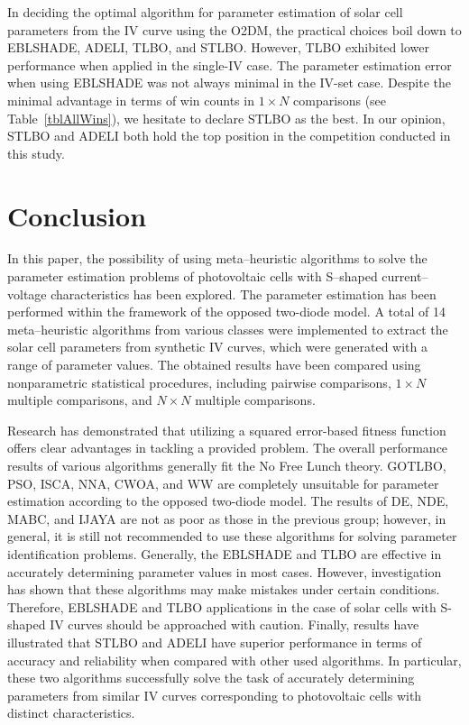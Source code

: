 \documentclass[a4paper,fleqn]{cas-dc}
\begin{document}
In deciding the optimal algorithm for parameter estimation of solar cell parameters
from the IV curve using the O2DM,
the practical choices boil down to EBLSHADE, ADELI, TLBO, and STLBO.
However, TLBO exhibited lower performance when applied in the single-IV case.
The parameter estimation error when using EBLSHADE was not always minimal in the IV-set case.
Despite the minimal advantage in terms of win counts in $1\times N$ comparisons
(see Table~\ref{tblAllWins}),
we hesitate to declare STLBO as the best.
In our opinion, STLBO and ADELI both hold the top position in the competition conducted in this study.





\section{Conclusion}

In this paper, the possibility of using meta--heuristic algorithms
to solve the parameter estimation problems of photovoltaic cells
with S--shaped current--voltage characteristics has been explored.
The parameter estimation has been performed within the framework of the opposed two-diode model.
A total of 14 meta--heuristic algorithms from various classes were implemented
to extract the solar cell parameters from synthetic IV curves, which were generated with a range of parameter values.
The obtained results have been compared using nonparametric statistical procedures,
including pairwise comparisons, $1\times N$ multiple comparisons, and $N\times N$ multiple comparisons.

Research has demonstrated that utilizing a squared error-based fitness function offers clear advantages in tackling a provided problem.
The overall performance results of various algorithms generally fit the No Free Lunch theory.
GOTLBO, PSO, ISCA, NNA, CWOA, and WW are completely unsuitable for parameter estimation according to the opposed two-diode model.
The results of DE, NDE, MABC, and IJAYA are not as poor as those in the previous group;
however, in general, it is still not recommended to use these algorithms for solving parameter identification problems.
Generally, the EBLSHADE and TLBO are effective in accurately determining parameter values in most cases.
However, investigation has shown that these algorithms may make mistakes under certain conditions.
Therefore, EBLSHADE and TLBO applications in the case of solar cells with S-shaped IV curves should be approached with caution.
Finally, results have illustrated that STLBO and ADELI have superior performance in terms of accuracy and reliability
when compared with other used algorithms.
In particular, these two algorithms successfully solve the task of accurately determining parameters
from similar IV curves corresponding to photovoltaic cells with distinct characteristics.
\end{document}
